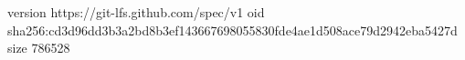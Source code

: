 version https://git-lfs.github.com/spec/v1
oid sha256:cd3d96dd3b3a2bd8b3ef143667698055830fde4ae1d508ace79d2942eba5427d
size 786528
